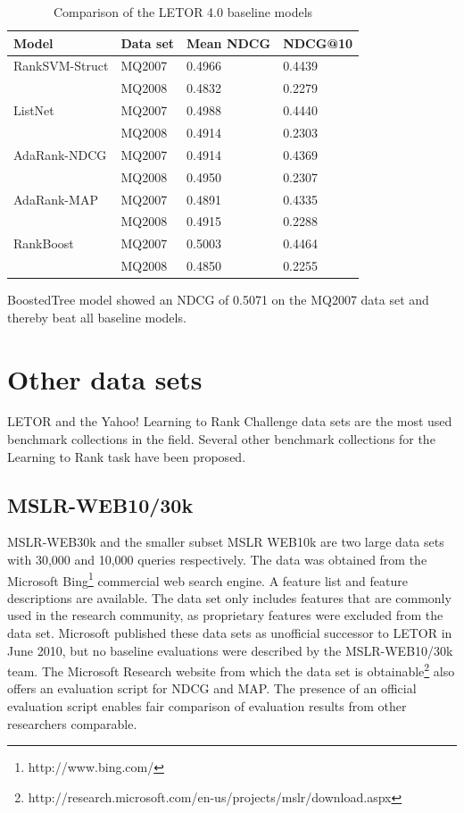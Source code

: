 \begin{table}
\begin{tabular}{l|lll}
Model & Data set & Mean \ac{NDCG} & \ac{NDCG}@10 \\ 
\hline
Rank\ac{SVM}-Struct & MQ2007 & 0.4966 & 0.4439 \\ 
 & MQ2008 & 0.4832 & 0.2279 \\ 
\hline
ListNet & MQ2007 & 0.4988 & 0.4440 \\ 
 & MQ2008 & 0.4914 & 0.2303 \\ 
\hline
AdaRank-\ac{NDCG} & MQ2007 & 0.4914 & 0.4369 \\ 
 & MQ2008 & 0.4950 & 0.2307 \\ 
\hline
AdaRank-\ac{MAP} & MQ2007 & 0.4891 & 0.4335 \\ 
 & MQ2008 & 0.4915 & 0.2288 \\ 
\hline
RankBoost & MQ2007 & 0.5003 & 0.4464 \\ 
 & MQ2008 & 0.4850 & 0.2255 \\ 
\end{tabular}
\caption{Comparison of the LETOR 4.0 baseline models}
\label{tab:letor4_baseline_results}
\end{table}

BoostedTree model \cite{Kocsis2013} showed an \ac{NDCG} of 0.5071 on the MQ2007 data set and thereby beat all baseline models.

\section{Other data sets}
LETOR and the Yahoo! Learning to Rank Challenge data sets are the most used benchmark collections in the field. Several other benchmark collections for the Learning to Rank task have been proposed.

\subsection{MSLR-WEB10/30k}
MSLR-WEB30k and the smaller subset MSLR WEB10k are two large data sets with 30,000 and 10,000 queries respectively. The data was obtained from the Microsoft Bing\footnote{http://www.bing.com/} commercial web search engine. A feature list and feature descriptions are available. The data set only includes features that are commonly used in the research community, as proprietary features were excluded from the data set. Microsoft published these data sets as unofficial successor to LETOR in June 2010, but no baseline evaluations were described by the MSLR-WEB10/30k team. The Microsoft Research website from which the data set is obtainable\footnote{http://research.microsoft.com/en-us/projects/mslr/download.aspx} also offers an evaluation script for \ac{NDCG} and \ac{MAP}. The presence of an official evaluation script enables fair comparison of evaluation results from other researchers comparable.

